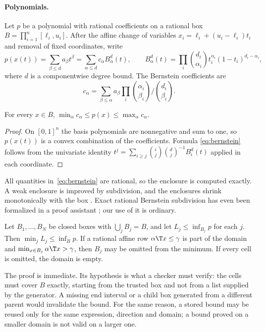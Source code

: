 \paragraph{Polynomials.}
Let $p$ be a polynomial with rational coefficients on a rational box
$B=\prod_{i=1}^n[\ell_i,u_i]$. After the affine change of variables
$x_i=\ell_i+(u_i-\ell_i)t_i$ and removal of fixed coordinates, write
\[
p(x(t))=\sum_{\beta\le d}a_\beta t^\beta=\sum_{\alpha\le d}c_\alpha B^d_\alpha(t),
\qquad
B^d_\alpha(t)=\prod_i\binom{d_i}{\alpha_i}t_i^{\alpha_i}(1-t_i)^{d_i-\alpha_i},
\]
where $d$ is a componentwise degree bound. The Bernstein coefficients
are
\begin{equation}\label{eq:bernstein}
c_\alpha=\sum_{\beta\le\alpha}a_\beta\prod_i
\binom{\alpha_i}{\beta_i}\Big/\binom{d_i}{\beta_i}.
\end{equation}

\begin{lemma}\label{lem:bernstein}
For every $x\in B$, $\min_\alpha c_\alpha\le p(x)\le\max_\alpha c_\alpha$.
\end{lemma}

\begin{proof}
On $[0,1]^n$ the basis polynomials are nonnegative and sum to one, so
$p(x(t))$ is a convex combination of the coefficients. Formula
\eqref{eq:bernstein} follows from the univariate identity
$t^j=\sum_{i\ge j}\binom ij\binom dj^{-1}B^d_i(t)$ applied in each
coordinate.
\end{proof}

All quantities in~\eqref{eq:bernstein} are rational, so the enclosure is
computed exactly. A weak enclosure is improved by subdivision, and the
enclosures shrink monotonically with the box
\citep{GarloffJanssonSmith2003}. Exact rational Bernstein subdivision has
even been formalized in a proof assistant \citep{MunozNarkawicz2013}; our
use of it is ordinary.

\begin{proposition}\label{prop:partition}
Let $B_1,\dots,B_N$ be closed boxes with $\bigcup_jB_j=B$, and let
$L_j\le\inf_{B_j}p$ for each $j$. Then $\min_jL_j\le\inf_Bp$. If a
rational affine row $\alpha\T x\le\gamma$ is part of the domain and
$\min_{x\in B_j}\alpha\T x>\gamma$, then $B_j$ may be omitted from the
minimum. If every cell is omitted, the domain is empty.
\end{proposition}

The proof is immediate. Its hypothesis is what a checker must verify:
the cells must cover $B$ exactly, starting from the trusted box and not
from a list supplied by the generator. A missing end interval or a
child box generated from a different parent would invalidate the bound.
For the same reason, a stored bound may be reused only for the same
expression, direction and domain; a bound proved on a smaller domain is
not valid on a larger one.

